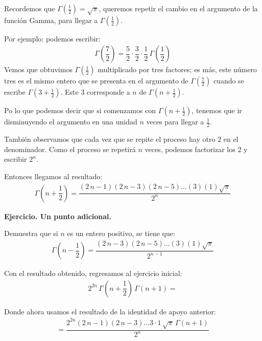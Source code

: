 Recordemos que $\Gamma(\frac{1}{2}) = \sqrt{\pi}$,  queremos repetir el cambio en el argumento de la función Gamma, para llegar a $\Gamma(\frac{1}{2})$.
\par
Por ejemplo: podemos escribir:
\begin{align*}
\Gamma \left( \dfrac{7}{2} \right) = \dfrac{5}{2} \cdot \dfrac{3}{2} \cdot \dfrac{1}{2} \, \Gamma \left( \dfrac{1}{2} \right)
\end{align*}
Vemos que obtuvimos $\Gamma(\frac{1}{2})$ multiplicado por tres factores;  es más, este número tres es el mismo entero que se presenta en el argumento de $\Gamma(\frac{7}{2})$ cuando se escribe $\Gamma(3 + \frac{1}{2})$. Este $3$ corresponde a $n$ de $\Gamma \left(n + \frac{1}{2}\right)$.
\par
Po lo que podemos decir que si comenzamos con $\Gamma \left(n + \frac{1}{2}\right)$, tenemos que ir disminuyendo el argumento en una unidad $n$ veces para llegar a $\frac{1}{2}$.
\par
También observamos que cada vez que se repite el proceso hay otro $2$ en el denominador. Como el proceso se repetirá $n$ veces, podemos factorizar los $2$ y escribir $2^{n}$.
\par
Entonces llegamos al resultado:
\begin{align*}
\Gamma\left( n + \dfrac{1}{2} \right) = \dfrac{(2 \, n {-} 1)(2 \, n {-} 3)(2 \, n {-} 5) \ldots (3)(1)\sqrt{\pi}}{2^{n}}
\end{align*}    

\begin{mdframed}
 \textbf{Ejercicio. Un punto adicional.}
 
Demuestra que si $n$ es un entero positivo, se tiene que:
\begin{align*}
\Gamma\left( n - \dfrac{1}{2} \right) = \dfrac{(2 \, n {-} 3)(2 \, n {-} 5) \ldots (3)(1)\sqrt{\pi}}{2^{n-1}}
\end{align*}
\end{mdframed}

Con el resultado obtenido, regresamos al ejercicio inicial:
\begin{align*}
2^{2n} \, \Gamma \left( n + \dfrac{1}{2} \right) \, \Gamma(n + 1) =
\end{align*}    

Donde ahora usamos el resultado de la identidad de apoyo anterior:
\begin{align*}
= \dfrac{2^{2n} (2 \, n {-} 1)(2 \, n - 3) \ldots 3 \cdot 1 \, \sqrt{\pi} \, \Gamma(n + 1)}{2^{n}}
\end{align*}

